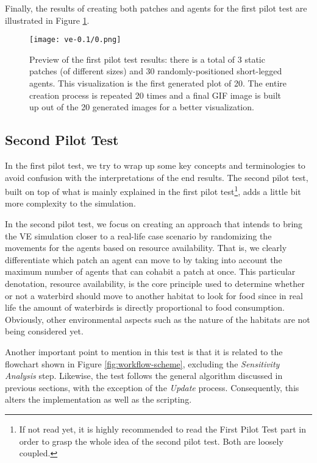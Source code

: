 Finally, the results of creating both patches and agents for the first pilot test are illustrated in Figure \ref{fig:pilot-test-1}.

\begin{figure}[h!]
    \centering
    \texttt{[image: ve-0.1/0.png]}
    \caption{Preview of the first pilot test results: there is a total of 3 static patches (of different sizes) and 30 randomly-positioned short-legged agents. This visualization is the first generated plot of 20. The entire creation process is repeated 20 times and a final GIF image is built up out of the 20 generated images for a better visualization.}
    \label{fig:pilot-test-1}
\end{figure}

\subsection{Second Pilot Test}
In the first pilot test, we try to wrap up some key concepts and terminologies to avoid confusion with the interpretations of the end results. The second pilot test, built on top of what is mainly explained in the first pilot test\footnote{If not read yet, it is highly recommended to read the First Pilot Test part in order to grasp the whole idea of the second pilot test. Both are loosely coupled.}, adds a little bit more complexity to the simulation.

In the second pilot test, we focus on creating an approach that intends to bring the VE simulation closer to a real-life case scenario by randomizing the movements for the agents based on resource availability. That is, we clearly differentiate which patch an agent can move to by taking into account the maximum number of agents that can cohabit a patch at once. This particular denotation, resource availability, is the core principle used to determine whether or not a waterbird should move to another habitat to look for food since in real life the amount of waterbirds is directly proportional to food consumption. Obviously, other environmental aspects such as the nature of the habitats are not being considered yet.

Another important point to mention in this test is that it is related to the flowchart shown in Figure \ref{fig:workflow-scheme}, excluding the \emph{Sensitivity Analysis} step. Likewise, the test follows the general algorithm discussed in previous sections, with the exception of the \emph{Update} process. Consequently, this alters the implementation as well as the scripting.

